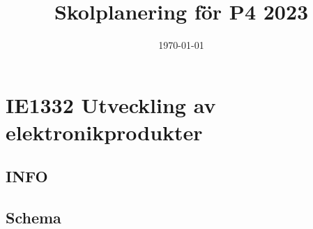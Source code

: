 \documentclass[11pt]{article}
\date{\today}
\title{Skolplanering för P4 2023}
\begin{document}
\maketitle
\tableofcontents


\section{IE1332 Utveckling av elektronikprodukter}
\label{sec:org2ac4732}
\subsection{INFO}
\label{sec:orgfac55ab}

\subsection{Schema}
\label{sec:org06a4617}
\end{document}
